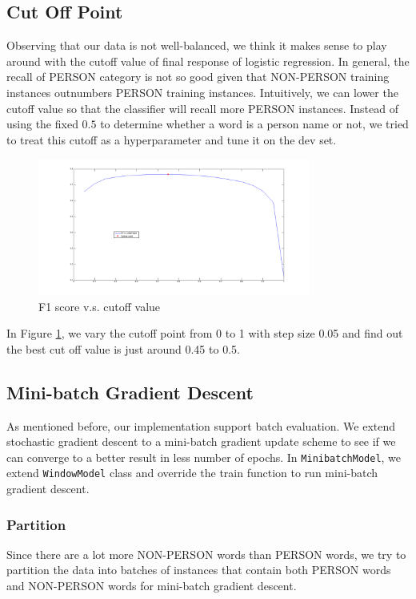 \documentclass[letterpaper]{article}
\begin{document}
\subsection{Cut Off Point}
Observing that our data is not well-balanced, we think it makes sense to play around with the cutoff value of final response of logistic regression. In general, the recall of PERSON category is not so good given that NON-PERSON training instances outnumbers PERSON training instances.
Intuitively, we can lower the cutoff value so that the classifier will recall more PERSON instances.
Instead of using the fixed $0.5$ to determine whether a word is a person name or not, we tried to treat this cutoff as a hyperparameter and tune it on the dev set.
\begin{figure}[ht]
\begin{center}
\includegraphics[width=0.8\textwidth]{f1.png}
\caption{F1 score v.s. cutoff value}
\label{fig:cutoff}
\end{center}
\end{figure}
In Figure \ref{fig:cutoff}, we vary the cutoff point from 0 to 1 with step size 0.05 and find out the best cut off value is just around 0.45 to 0.5.


\subsection{Mini-batch Gradient Descent}
As mentioned before, our implementation support batch evaluation.
We extend stochastic gradient descent to a mini-batch gradient update scheme to see if we can converge to a better result in less number of epochs. In \texttt{MinibatchModel}, we extend \texttt{WindowModel} class and override the train function to run mini-batch gradient descent.


\subsubsection{Partition}
Since there are a lot more NON-PERSON words than PERSON words, we try to partition the data into batches of instances that contain both PERSON words and NON-PERSON words for mini-batch gradient descent.
\end{document}
